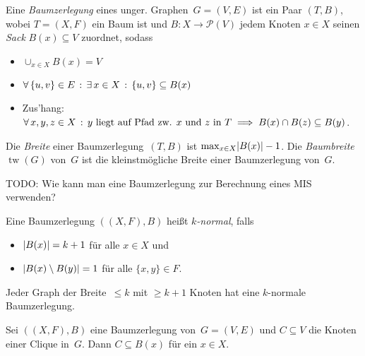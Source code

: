 \documentclass{cheat-sheet}
\newcommand{\size}[1]{\abs{#1}} %
\newcommand{\Powerset}{\mathcal{P}} %
\DeclareMathOperator{\treewidth}{tw} %
\begin{document}
\begin{defn}
  Eine \emph{Baumzerlegung} eines unger. Graphen~$G = (V, E)$ ist ein Paar $(T, B)$, wobei $T = (X, F)$ ein Baum ist und $B : X \to \Powerset(V)$ jedem Knoten $x \in X$ seinen \textit{Sack} $B(x) \subseteq V$ zuordnet, sodass
  \begin{itemize}
    \item $\cup_{x \in X} B(x) = V$
    \item $\forall \, {\{ u, v \} \in E} \,:\, \exists \, {x \in X} \,:\, \{ u, v \} \subseteq B(x)$
    \item Zus'hang: $\forall \, {x, y, z \in X} \,:\, \text{$y$ liegt auf Pfad zw. $x$ und~$z$ in~$T$} \implies B(x) \cap B(z) \subseteq B(y)$.
  \end{itemize}
  Die \emph{Breite} einer Baumzerlegung~$(T, B)$ ist $\max_{x \in X} \size{B(x)} - 1$.
  Die \emph{Baumbreite} $\treewidth(G)$ von~$G$ ist die kleinstmögliche Breite einer Baumzerlegung von~$G$.
\end{defn}


TODO: Wie kann man eine Baumzerlegung zur Berechnung eines MIS verwenden?

\begin{defn}
  Eine Baumzerlegung $((X, F), B)$ heißt \emph{$k$-normal}, falls
  \begin{itemize}
    \item $\size{B(x)} = k + 1$ für alle $x \in X$ und
    \item $\size{B(x) \setminus B(y)} = 1$ für alle $\{ x, y \} \in F$.
  \end{itemize}
\end{defn}

\begin{lem}
  Jeder Graph der Breite~$\leq k$ mit $\geq k + 1$ Knoten hat eine $k$-normale Baumzerlegung.
\end{lem}



\begin{lem}
  Sei $((X,F), B)$ eine Baumzerlegung von~$G = (V, E)$ und $C \subseteq V$ die Knoten einer Clique in~$G$.
  Dann $C \subseteq B(x)$ für ein $x \in X$.
\end{lem}
\end{document}
